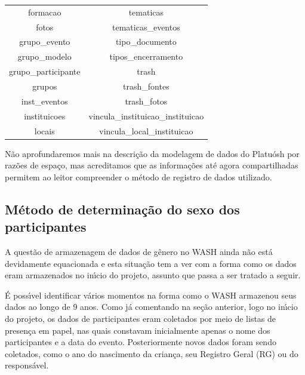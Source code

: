 \documentclass[
12pt,		%
openright,	%
twoside,  %
a4paper,			%
chapter=TITLE,		%
english,			%
french,				%
spanish,			%
brazil				%
]{USPSC-classe/USPSC}
\begin{document}
\begin{table}[htb]
\begin{tabular}{|c|c|}
 formacao                       &   tematicas \\
 fotos                          &   tematicas\_eventos \\
 grupo\_evento                   &   tipo\_documento \\
 grupo\_modelo                   &   tipos\_encerramento \\
 grupo\_participante             &   trash \\
 grupos                         &   trash\_fontes \\
 inst\_eventos                   &   trash\_fotos \\
 instituicoes                   &   vincula\_instituicao\_instituicao \\
 locais                         &   vincula\_local\_instituicao \\
\hline
\end{tabular}
\end{table}


N\~ao aprofundaremos mais na descri\c{c}\~ao da modelagem de dados do Platu\'osh por raz\~oes de espa\c{c}o, mas acreditamos que as informa\c{c}\~oes at\'e agora compartilhadas permitem ao leitor compreender o m\'etodo de registro de dados utilizado.









\subsection[M\'etodo de determina\c{c}\~ao do sexo dos participantes]{M\'etodo de determina\c{c}\~ao do sexo dos participantes}\label{M\'etodo de determina\c{c}\~ao do sexo dos participantes}
A quest\~ao de armazenagem de dados de g\^enero no WASH ainda n\~ao est\'a devidamente equacionada e esta situa\c{c}\~ao tem a ver com a forma como os dados eram armazenados no in\'{\i}cio do projeto, assunto que passa a ser tratado a seguir.









\'E poss\'{\i}vel identificar v\'arios momentos na forma como o WASH armazenou seus dados ao longo de 9 anos. Como j\'a comentando na se\c{c}\~ao anterior, logo no in\'{\i}cio do projeto, os dados de participantes eram coletados por meio de listas de presen\c{c}a em papel, nas quais constavam inicialmente apenas o nome dos participantes e a data do evento. Posteriormente novos dados foram sendo coletados, como o ano do nascimento da crian\c{c}a, seu Registro Geral (RG) ou do respons\'avel.
\end{document}
